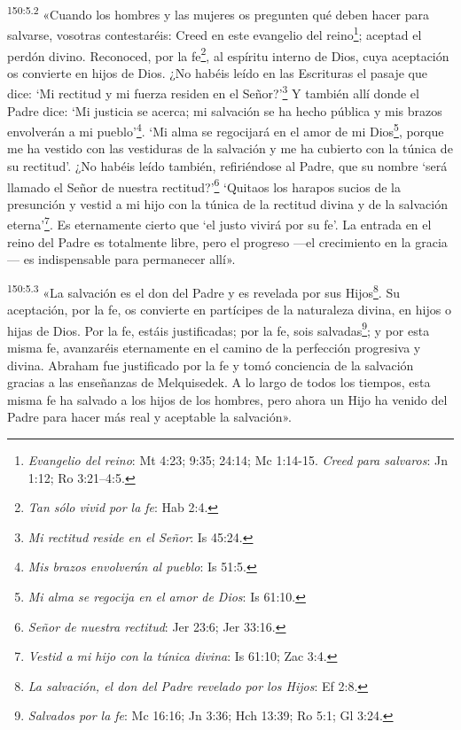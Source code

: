 \par 
\textsuperscript{150:5.2} «Cuando los hombres y las mujeres os pregunten qué deben hacer para salvarse, vosotras contestaréis: Creed en este evangelio del reino\footnote{\textit{Evangelio del reino}: Mt 4:23; 9:35; 24:14; Mc 1:14-15. \textit{Creed para salvaros}: Jn 1:12; Ro 3:21--4:5.}; aceptad el perdón divino. Reconoced, por la fe\footnote{\textit{Tan sólo vivid por la fe}: Hab 2:4.}, al espíritu interno de Dios, cuya aceptación os convierte en hijos de Dios. ¿No habéis leído en las Escrituras el pasaje que dice: `Mi rectitud y mi fuerza residen en el Señor?'\footnote{\textit{Mi rectitud reside en el Señor}: Is 45:24.} Y también allí donde el Padre dice: `Mi justicia se acerca; mi salvación se ha hecho pública y mis brazos envolverán a mi pueblo'\footnote{\textit{Mis brazos envolverán al pueblo}: Is 51:5.}. `Mi alma se regocijará en el amor de mi Dios\footnote{\textit{Mi alma se regocija en el amor de Dios}: Is 61:10.}, porque me ha vestido con las vestiduras de la salvación y me ha cubierto con la túnica de su rectitud'. ¿No habéis leído también, refiriéndose al Padre, que su nombre `será llamado el Señor de nuestra rectitud?'\footnote{\textit{Señor de nuestra rectitud}: Jer 23:6; Jer 33:16.} `Quitaos los harapos sucios de la presunción y vestid a mi hijo con la túnica de la rectitud divina y de la salvación eterna'\footnote{\textit{Vestid a mi hijo con la túnica divina}: Is 61:10; Zac 3:4.}. Es eternamente cierto que `el justo vivirá por su fe'. La entrada en el reino del Padre es totalmente libre, pero el progreso ---el crecimiento en la gracia--- es indispensable para permanecer allí».

\par 
\textsuperscript{150:5.3} «La salvación es el don del Padre y es revelada por sus Hijos\footnote{\textit{La salvación, el don del Padre revelado por los Hijos}: Ef 2:8.}. Su aceptación, por la fe, os convierte en partícipes de la naturaleza divina, en hijos o hijas de Dios. Por la fe, estáis justificadas; por la fe, sois salvadas\footnote{\textit{Salvados por la fe}: Mc 16:16; Jn 3:36; Hch 13:39; Ro 5:1; Gl 3:24.}; y por esta misma fe, avanzaréis eternamente en el camino de la perfección progresiva y divina. Abraham fue justificado por la fe y tomó conciencia de la salvación gracias a las enseñanzas de Melquisedek. A lo largo de todos los tiempos, esta misma fe ha salvado a los hijos de los hombres, pero ahora un Hijo ha venido del Padre para hacer más real y aceptable la salvación».

